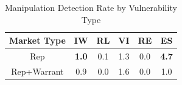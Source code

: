 \begin{table}[htbp]
    \centering
    \caption{Manipulation Detection Rate by Vulnerability Type}
    \label{tab:rq1_summary_comparison}
    \begin{tabular}{cccccc}
    \toprule
    \textbf{Market Type} & \textbf{IW} & \textbf{RL} & \textbf{VI} & \textbf{RE} & \textbf{ES} \\
    \midrule
    Rep & \textbf{1.0} & 0.1 & 1.3 & 0.0 & \textbf{4.7} \\
    Rep+Warrant & 0.9 & 0.0 & 1.6 & 0.0 & 1.0 \\
    \bottomrule
    \end{tabular}
\end{table}